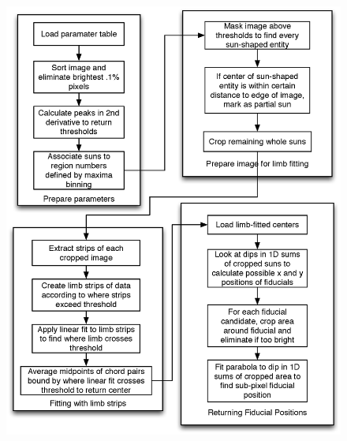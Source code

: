 \documentclass[10pt]{scrartcl}
\begin{document}
\begin{figure}[!ht]
    \centering
    \includegraphics[width=.9\textwidth]{../plots_tables_images/new_alphaflowchart.eps}    
    \caption{}
    \label{flowchart}
\end{figure}
\end{document}
